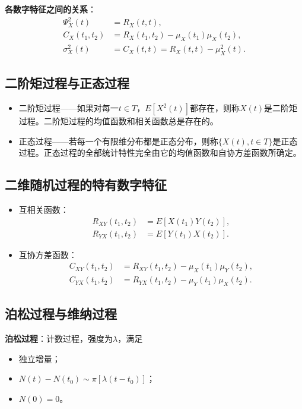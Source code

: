 \documentclass[11pt,a4paper]{report}
\theoremstyle{definition}
\begin{document}
\textbf{各数字特征之间的关系}：
\begin{align*}
\Psi_X^2(t)&=R_X(t,t),\\
C_X(t_1,t_2)&=R_X(t_1,t_2)-\mu_X(t_1)\mu_X(t_2),\\
\sigma_X^2(t)&=C_X(t,t)=R_X(t,t)-\mu_X^2(t).
\end{align*}

\subsection*{二阶矩过程与正态过程}

\begin{itemize}[leftmargin=2em]
    \item 二阶矩过程——如果对每一$t\in T$，$E[X^2(t)]$都存在，则称$X(t)$是二阶矩过程。二阶矩过程的均值函数和相关函数总是存在的。
    \item 正态过程——若每一个有限维分布都是正态分布，则称$\{X(t),t\in T\}$是正态过程。正态过程的全部统计特性完全由它的均值函数和自协方差函数所确定。
\end{itemize}

\subsection*{二维随机过程的特有数字特征}

\begin{itemize}[leftmargin=2em]
    \item 互相关函数：
    \begin{align*}
    R_{XY}(t_1,t_2)&=E[X(t_1)Y(t_2)],\\
    R_{YX}(t_1,t_2)&=E[Y(t_1)X(t_2)].
    \end{align*}
    \item 互协方差函数：
    \begin{align*}
    C_{XY}(t_1,t_2)&=R_{XY}(t_1,t_2)-\mu_X(t_1)\mu_Y(t_2),\\
    C_{YX}(t_1,t_2)&=R_{YX}(t_1,t_2)-\mu_Y(t_1)\mu_X(t_2).
    \end{align*}
\end{itemize}

\subsection*{泊松过程与维纳过程}

\textbf{泊松过程}：计数过程，强度为$\lambda$，满足
\begin{itemize}[leftmargin=2em]
    \item 独立增量；
    \item $N(t)-N(t_0)\sim\pi[\lambda(t-t_0)]$；
    \item $N(0)=0$。
\end{itemize}
\end{document}
